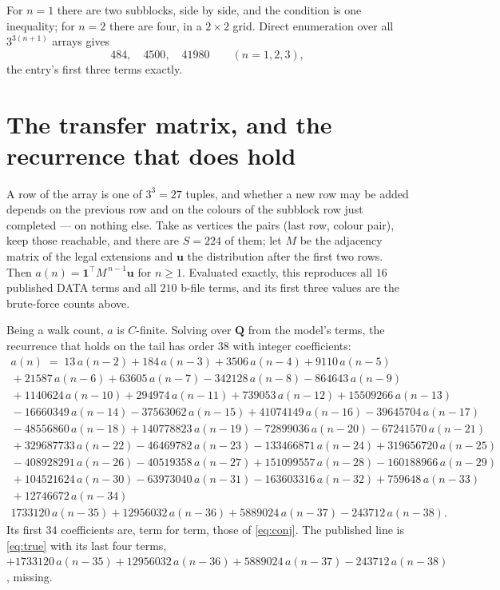 \documentclass[11pt,a4paper]{article}
\theoremstyle{plain}
\theoremstyle{definition}
\begin{document}
For $n=1$ there are two subblocks, side by side, and the condition is one inequality; for
$n=2$ there are four, in a $2\times2$ grid. Direct enumeration over all $3^{3(n+1)}$ arrays
gives
\[
484,\quad 4500,\quad 41980 \qquad (n=1,2,3),
\]
the entry's first three terms exactly.

\section{The transfer matrix, and the recurrence that does hold}

A row of the array is one of $3^{3}=27$ tuples, and whether a new row may be added depends on
the previous row and on the colours of the subblock row just completed --- on nothing else.
Take as vertices the pairs (last row, colour pair), keep those reachable, and there are
$S=224$ of them; let $M$ be the adjacency matrix of the legal extensions and $\mathbf u$ the
distribution after the first two rows. Then $a(n)=\mathbf1^{\!\top}M^{\,n-1}\mathbf u$ for
$n\ge1$. Evaluated exactly, this reproduces all $16$ published DATA terms and all $210$
b-file terms, and its first three values are the brute-force counts above.

Being a walk count, $a$ is $C$-finite. Solving over $\mathbf Q$ from the model's terms, the
recurrence that holds on the tail has order $38$ with integer coefficients:
\begin{multline}\label{eq:true}
a(n)\;=\;13\,a(n-2) + 184\,a(n-3) + 3506\,a(n-4) + 9110\,a(n-5)\\
{}+ 21587\,a(n-6) + 63605\,a(n-7) - 342128\,a(n-8) - 864643\,a(n-9)\\
{}+ 1140624\,a(n-10) + 294974\,a(n-11) + 739053\,a(n-12) + 15509266\,a(n-13)\\
{}- 16660349\,a(n-14) - 37563062\,a(n-15) + 41074149\,a(n-16) - 39645704\,a(n-17)\\
{}- 48556860\,a(n-18) + 140778823\,a(n-19) - 72899036\,a(n-20) - 67241570\,a(n-21)\\
{}+ 329687733\,a(n-22) - 46469782\,a(n-23) - 133466871\,a(n-24) + 319656720\,a(n-25)\\
{}- 408928291\,a(n-26) - 40519358\,a(n-27) + 151099557\,a(n-28) - 160188966\,a(n-29)\\
{}+ 104521624\,a(n-30) - 63973040\,a(n-31) - 163603316\,a(n-32) + 759648\,a(n-33)\\
{}+ 12746672\,a(n-34)\\
{}1733120\,a(n-35) + 12956032\,a(n-36) + 5889024\,a(n-37) - 243712\,a(n-38).
\end{multline}
Its first $34$ coefficients are, term for term, those of \eqref{eq:conj}. The published line
is \eqref{eq:true} with its last four terms,
$+1733120\,a(n-35)+12956032\,a(n-36)+5889024\,a(n-37)-243712\,a(n-38)$, missing.
\end{document}
